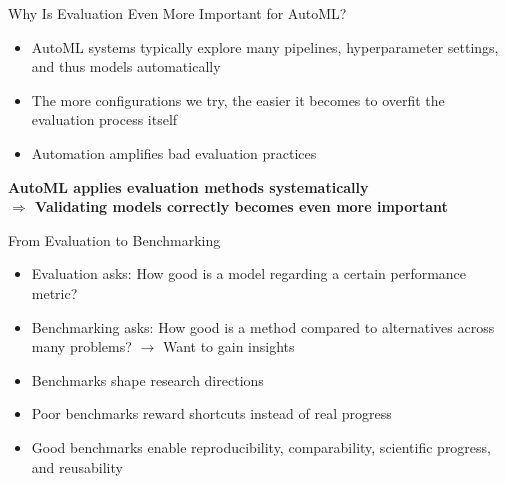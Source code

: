 \documentclass[main]{subfiles}
\begin{document}
\begin{frame}[c]{Why Is Evaluation Even More Important for AutoML?}
    \begin{itemize}
        \item AutoML systems typically explore many pipelines, hyperparameter settings, and thus models automatically
        \item The more configurations we try, the easier it becomes to overfit the evaluation process itself
        \item Automation amplifies bad evaluation practices
    \end{itemize}
    \vspace{0.5cm}
    \textbf{AutoML applies evaluation methods systematically}\\
    \textbf{$\Rightarrow$ Validating models correctly becomes even more important}
\end{frame}

\begin{frame}{From Evaluation to Benchmarking}
\begin{itemize}
    \item Evaluation asks: How good is a model regarding a certain performance metric?
    \item Benchmarking asks: How good is a method compared to alternatives across many problems? $\rightarrow $ Want to gain \alert{insights}
\end{itemize}
\vspace{0.5cm}
\begin{itemize}
    \item Benchmarks shape research directions
    \item Poor benchmarks reward shortcuts instead of real progress
    \item Good benchmarks enable reproducibility, comparability, scientific progress, and reusability
\end{itemize}
\end{frame}
    
\end{document}
